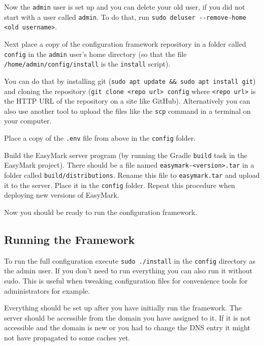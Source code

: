 \documentclass[12pt,a4paper]{report}
\begin{document}
	Now the \lstinline|admin| user is set up and you can delete your old user, if you did not start with a user called \lstinline|admin|. To do that, run \lstinline|sudo deluser --remove-home <old username>|.
	
	Next place a copy of the configuration framework repository in a folder called \lstinline|config| in the \lstinline|admin| user's home directory (so that the file \lstinline|/home/admin/config/install| is the \lstinline|install| script).
	
	You can do that by installing git (\lstinline|sudo apt update && sudo apt install git|) and cloning the repository (\lstinline|git clone <repo url> config| where \lstinline|<repo url>| is the HTTP URL of the repository on a site like GitHub). Alternatively you can also use another tool to upload the files like the \lstinline|scp| command in a terminal on your computer.
	
	Place a copy of the \lstinline|.env| file from above in the \lstinline|config| folder.
	
	\pagebreak
	Build the EasyMark server program (by running the Gradle \lstinline|build| task in the EasyMark project). There should be a file named \lstinline|easymark-<version>.tar| in a folder called \lstinline|build/distributions|. Rename this file to \lstinline|easymark.tar| and upload it to the server. Place it in the \lstinline|config| folder. Repeat this procedure when deploying new versions of EasyMark.
	
	Now you should be ready to run the configuration framework.
	
	\subsection{Running the Framework}
	To run the full configuration execute \lstinline|sudo ./install| in the \lstinline|config| directory as the admin user. If you don't need to run everything you can also run it without sudo. This is useful when tweaking configuration files for convenience tools for administrators for example.
	
	Everything should be set up after you have initially run the framework. The server should be accessible from the domain you have assigned to it. If it is not accessible and the domain is new or you had to change the DNS entry it might not have propagated to some caches yet.
\end{document}
